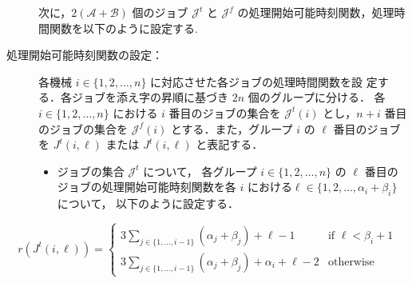 \documentclass[12pt]{optlab-bachelor}
\begin{document}
\begin{description}
  \item[] 次に，$2(\mathcal{A} + \mathcal{B})$ 個のジョブ $\mathcal{J}^t$ と $\mathcal{J}^f$ の処理開始可能時刻関数，処理時間関数を以下のように設定する.
  \item[処理開始可能時刻関数の設定：] 各機械 $i \in \{1,2,\ldots,n\}$ に対応させた各ジョブの処理時間関数を設
  定する．各ジョブを添え字の昇順に基づき $2n$ 個のグループに分ける． 各 $i
  \in \{1,2,\ldots,n\}$ における $i$ 番目のジョブの集合を
  $\mathcal{J}^t(i)$ とし，$n + i$ 番目のジョブの集合を
  $\mathcal{J}^f(i)$ とする．また，グループ $i$ の $\ell$ 番目のジョブ
  を $J^t(i,\ell)$ または $J^t(i,\ell)$ と表記する．
  \begin{itemize}
    \item ジョブの集合 $\mathcal{J}^t$ について， 各グループ $i \in
    \{1,2,\ldots, n\}$ の $\ell$ 番目のジョブの処理開始可能時刻関数を各
    $i$ における$\ell \in \{1,2,\ldots, \alpha_i + \beta_i\}$ について，
    以下のように設定する．
  \end{itemize}
\end{description}
\begin{displaymath}
  r(J^t(i,\ell)) =
  \left\{ \begin{array}{lll} 3 \displaystyle
  \sum_{j \in \{1,\ldots,i - 1\}}(\alpha_j + \beta_j) + \ell - 1 &
  \text{if } \ell < \beta_i + 1 \\ 3 \displaystyle \sum_{j \in \{1,\ldots,i - 1\}}(\alpha_j + \beta_j) + \alpha_i + \ell - 2 & \text{otherwise} \end{array} \right.
\end{displaymath}
\end{document}

